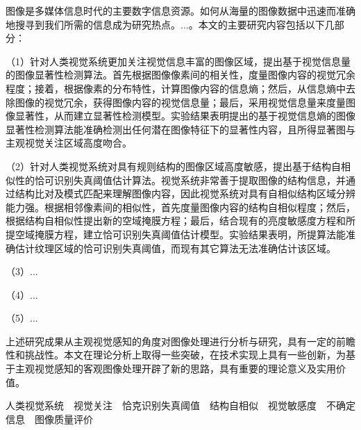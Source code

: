 
\begin{cabstract}
图像是多媒体信息时代的主要数字信息资源。如何从海量的图像数据中迅速而准确地搜寻到我们所需的信息成为研究热点。...。本文的主要研究内容包括以下几部分：

（1）针对人类视觉系统更加关注视觉信息丰富的图像区域，提出基于视觉信息量的图像显著性检测算法。首先根据图像像素间的相关性，度量图像内容的视觉冗余程度；接着，根据像素的分布特性，计算图像内容的信息熵；然后，从信息熵中去除图像的视觉冗余，获得图像内容的视觉信息量；最后，采用视觉信息量来度量图像显著性，从而建立显著性检测模型。实验结果表明提出的基于视觉信息熵的图像显著性检测算法能准确检测出任何潜在图像特征下的显著性内容，且所得显著图与主观视觉关注区域高度吻合。

（2）针对人类视觉系统对具有规则结构的图像区域高度敏感，提出基于结构自相似性的恰可识别失真阈值估计算法。视觉系统非常善于提取图像的结构信息，并通过结构比对及模式匹配来理解图像内容，因此视觉系统对具有自相似结构区域分辨能力强。根据相邻像素间的相似性，首先度量图像内容的结构自相似程度；然后，根据结构自相似性提出新的空域掩膜方程；最后，结合现有的亮度敏感度方程和所提空域掩膜方程，建立恰可识别失真阈值估计模型。实验结果表明，所提算法能准确估计纹理区域的恰可识别失真阈值，而现有其它算法无法准确估计该区域。

（3）...

（4）...

（5）...

上述研究成果从主观视觉感知的角度对图像处理进行分析与研究，具有一定的前瞻性和挑战性。本文在理论分析上取得一些突破，在技术实现上具有一些创新，为基于主观视觉感知的客观图像处理开辟了新的思路，具有重要的理论意义及实用价值。

\end{cabstract}


\begin{ckeywords}
人类视觉系统~~视觉关注~~恰克识别失真阈值~~结构自相似~~视觉敏感度~~不确定信息~~图像质量评价
\end{ckeywords}




